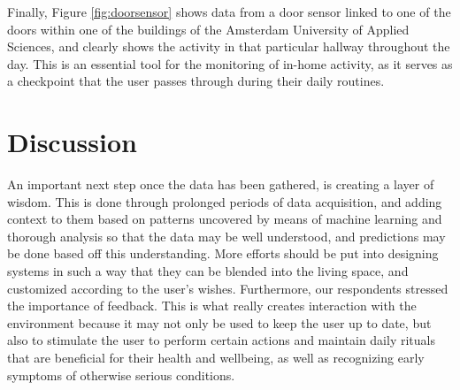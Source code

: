 \documentclass{below-ext}
\begin{document}
Finally, Figure \ref{fig:doorsensor} shows data from a door sensor linked to one of the doors within one of the buildings of the Amsterdam University of Applied Sciences, and clearly shows the activity in that particular hallway throughout the day. This is an essential tool for the monitoring of in-home activity, as it serves as a checkpoint that the user passes through during their daily routines.

\section{Discussion}
An important next step once the data has been gathered, is creating a layer of wisdom. This is done through prolonged periods of data acquisition, and adding context to them based on patterns uncovered by means of machine learning and thorough analysis so that the data may be well understood, and predictions may be done based off this understanding. More efforts should be put into designing systems in such a way that they can be blended into the living space, and customized according to the user's wishes. Furthermore, our respondents stressed the importance of feedback. This is what really creates interaction with the environment because it may not only be used to keep the user up to date, but also to stimulate the user to perform certain actions and maintain daily rituals that are beneficial for their health and wellbeing, as well as recognizing early symptoms of otherwise serious conditions.
\end{document}
